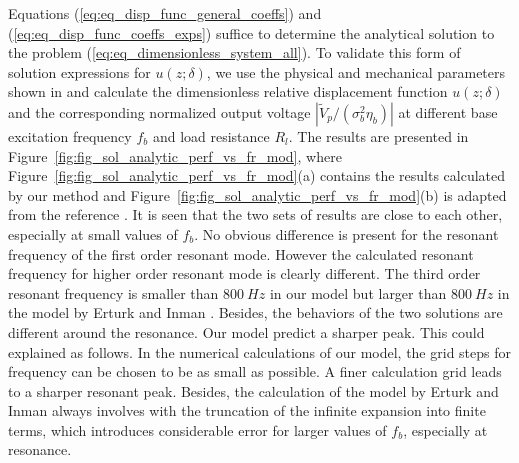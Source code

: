 \documentclass{svjour3}                     %
\begin{document}
Equations (\ref{eq:eq_disp_func_general_coeffs}) and (\ref{eq:eq_disp_func_coeffs_exps}) suffice to determine the analytical solution to the problem (\ref{eq:eq_dimensionless_system_all}). To validate this form of solution expressions for $u(z;\delta)$, we use the physical and mechanical parameters shown in \cite{erturk2008distributed} and calculate the dimensionless relative displacement function $u(z;\delta)$ and the corresponding normalized output voltage $| \tilde{V}_p/(\sigma_b^2 \eta_b) |$ at different base excitation frequency $f_b$ and load resistance $R_l$. The results are presented in Figure~\ref{fig:fig_sol_analytic_perf_vs_fr_mod}, where Figure~\ref{fig:fig_sol_analytic_perf_vs_fr_mod}(a) contains the results calculated by our method and Figure~\ref{fig:fig_sol_analytic_perf_vs_fr_mod}(b) is adapted from the reference \cite{erturk2008distributed}. It is seen that the two sets of results are close to each other, especially at small values of $f_b$. No obvious difference is present for the resonant frequency of the first order resonant mode. However the calculated resonant frequency for higher order resonant mode is clearly different. The third order resonant frequency is smaller than $800\ Hz$ in our model but larger than $800\ Hz$ in the model by Erturk and Inman \cite{erturk2008distributed}. Besides, the behaviors of the two solutions are different around the resonance. Our model predict a sharper peak. This could explained as follows. In the numerical calculations of our model, the grid steps for frequency can be chosen to be as small as possible. A finer calculation grid leads to a sharper resonant peak. Besides, the calculation of the model by Erturk and Inman \cite{erturk2008distributed} always involves with the truncation of the infinite expansion into finite terms, which introduces considerable error for larger values of $f_b$, especially at resonance. 
\end{document}

